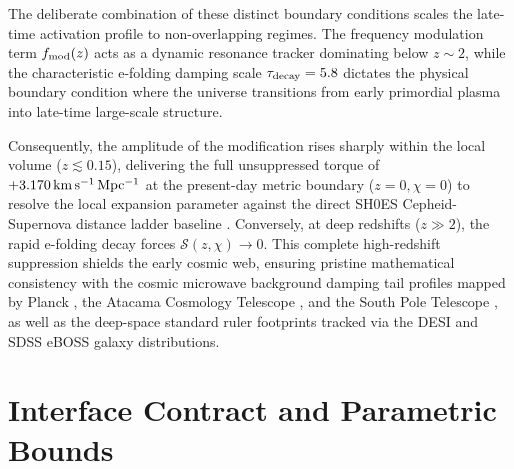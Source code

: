 The deliberate combination of these distinct boundary conditions scales the late-time activation profile to non-overlapping regimes. The frequency modulation term $f_{\rm mod}(z)$ acts as a dynamic resonance tracker dominating below $z \sim 2$, while the characteristic e-folding damping scale $\tau_{\rm decay} = 5.8$ dictates the physical boundary condition where the universe transitions from early primordial plasma into late-time large-scale structure. 

Consequently, the amplitude of the modification rises sharply within the local volume ($z \lesssim 0.15$), delivering the full unsuppressed torque of $+3.170\,{\rm km\,s^{-1}\,Mpc^{-1}}$ at the present-day metric boundary ($z=0, \chi=0$) to resolve the local expansion parameter against the direct SH0ES Cepheid-Supernova distance ladder baseline \cite{SHOES2022}. Conversely, at deep redshifts ($z \gg 2$), the rapid e-folding decay forces $\mathcal{S}(z, \chi) \to 0$. This complete high-redshift suppression shields the early cosmic web, ensuring pristine mathematical consistency with the cosmic microwave background damping tail profiles mapped by Planck \cite{Planck2018}, the Atacama Cosmology Telescope \cite{ACTDR6}, and the South Pole Telescope \cite{SPT3G}, as well as the deep-space standard ruler footprints tracked via the DESI \cite{DESIDR1} and SDSS eBOSS \cite{SDSS_eBOSS} galaxy distributions.

\section{Interface Contract and Parametric Bounds}

